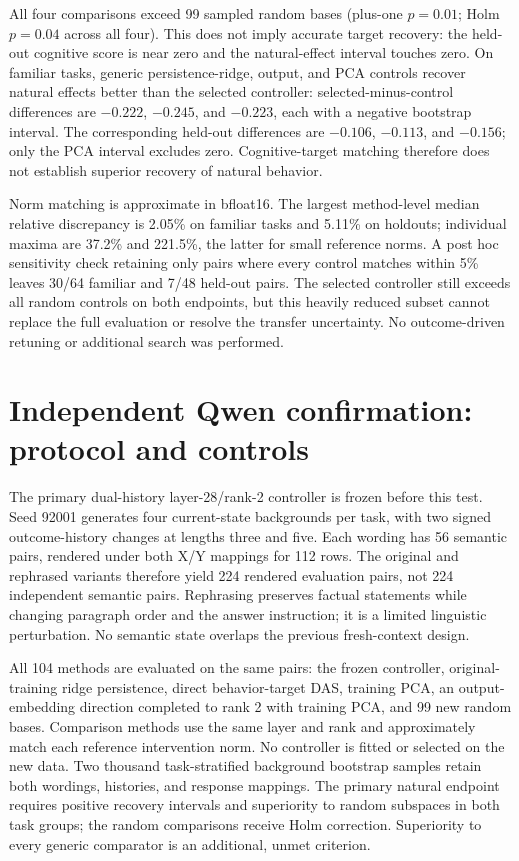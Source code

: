 \documentclass{article}
\begin{document}
All four comparisons exceed 99 sampled random bases (plus-one $p=0.01$; Holm $p=0.04$ across all four). This does not imply accurate target recovery: the held-out cognitive score is near zero and the natural-effect interval touches zero. On familiar tasks, generic persistence-ridge, output, and PCA controls recover natural effects better than the selected controller: selected-minus-control differences are $-0.222$, $-0.245$, and $-0.223$, each with a negative bootstrap interval. The corresponding held-out differences are $-0.106$, $-0.113$, and $-0.156$; only the PCA interval excludes zero. Cognitive-target matching therefore does not establish superior recovery of natural behavior.

Norm matching is approximate in bfloat16. The largest method-level median relative discrepancy is 2.05\% on familiar tasks and 5.11\% on holdouts; individual maxima are 37.2\% and 221.5\%, the latter for small reference norms. A post hoc sensitivity check retaining only pairs where every control matches within 5\% leaves 30/64 familiar and 7/48 held-out pairs. The selected controller still exceeds all random controls on both endpoints, but this heavily reduced subset cannot replace the full evaluation or resolve the transfer uncertainty. No outcome-driven retuning or additional search was performed.

\section{Independent Qwen confirmation: protocol and controls}\label{app:confirmation}
The primary dual-history layer-28/rank-2 controller is frozen before this test. Seed 92001 generates four current-state backgrounds per task, with two signed outcome-history changes at lengths three and five. Each wording has 56 semantic pairs, rendered under both X/Y mappings for 112 rows. The original and rephrased variants therefore yield 224 rendered evaluation pairs, not 224 independent semantic pairs. Rephrasing preserves factual statements while changing paragraph order and the answer instruction; it is a limited linguistic perturbation. No semantic state overlaps the previous fresh-context design.

All 104 methods are evaluated on the same pairs: the frozen controller, original-training ridge persistence, direct behavior-target DAS, training PCA, an output-embedding direction completed to rank 2 with training PCA, and 99 new random bases. Comparison methods use the same layer and rank and approximately match each reference intervention norm. No controller is fitted or selected on the new data. Two thousand task-stratified background bootstrap samples retain both wordings, histories, and response mappings. The primary natural endpoint requires positive recovery intervals and superiority to random subspaces in both task groups; the random comparisons receive Holm correction. Superiority to every generic comparator is an additional, unmet criterion.
\end{document}
